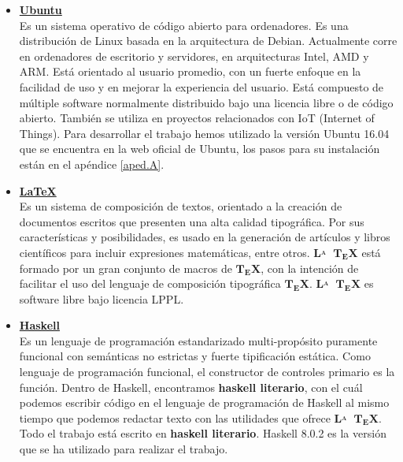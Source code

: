 \begin{itemize}

\item \href{https://www.ubuntu.com/}{\textbf{Ubuntu}}\\
Es un sistema operativo de código abierto para ordenadores. Es una distribución de Linux basada en la arquitectura de Debian. Actualmente corre en ordenadores de escritorio y servidores, en arquitecturas Intel, AMD y ARM. Está orientado al usuario promedio, con un fuerte enfoque en la facilidad de uso y en mejorar la experiencia del usuario. Está compuesto de múltiple software normalmente distribuido bajo una licencia libre o de código abierto. También se utiliza en proyectos relacionados con IoT (Internet of Things). Para desarrollar el trabajo hemos utilizado la versión Ubuntu 16.04 que se encuentra en la web oficial de Ubuntu, los pasos para su instalación están en el apéndice \ref{aped.A}. 

\item \href{https://www.latex-project.org/}{\textbf{LaTeX}}  \\
Es un sistema de composición de textos, orientado a la creación de documentos escritos que presenten una alta calidad tipográfica. Por sus características y posibilidades, es usado en la generación de artículos y libros científicos para incluir expresiones matemáticas, entre otros.  $\mathbf{L\!\!^{{}_{\scriptstyle A}} \!\!\!\!\!\;\; T\!_{\displaystyle E} \! X}$ está formado por un gran conjunto de macros de  $\mathbf{T\!_{\displaystyle E} \! X}$, con la intención de facilitar el uso del lenguaje de composición tipográfica ${\displaystyle \mathbf {T\!_{\displaystyle E}\!X} }$. $\mathbf{L\!\!^{{}_{\scriptstyle A}} \!\!\!\!\!\;\; T\!_{\displaystyle E} \! X}$ es software libre bajo licencia LPPL. 

\item \href{https://www.haskell.org/}{\textbf{Haskell}}\\
Es un lenguaje de programación estandarizado multi-propósito puramente funcional con semánticas no estrictas y fuerte tipificación estática. Como lenguaje de programación funcional, el constructor de controles primario es la función. Dentro de Haskell, encontramos \textbf{haskell literario}, con el cuál podemos escribir código en el lenguaje de programación de Haskell al mismo tiempo que podemos redactar texto con las utilidades que ofrece $\mathbf{L\!\!^{{}_{\scriptstyle A}} \!\!\!\!\!\;\; T\!_{\displaystyle E} \! X}$. Todo el trabajo está escrito en  \textbf{haskell literario}. Haskell 8.0.2 es la versión que se ha utilizado para realizar el trabajo.


\end{itemize}
